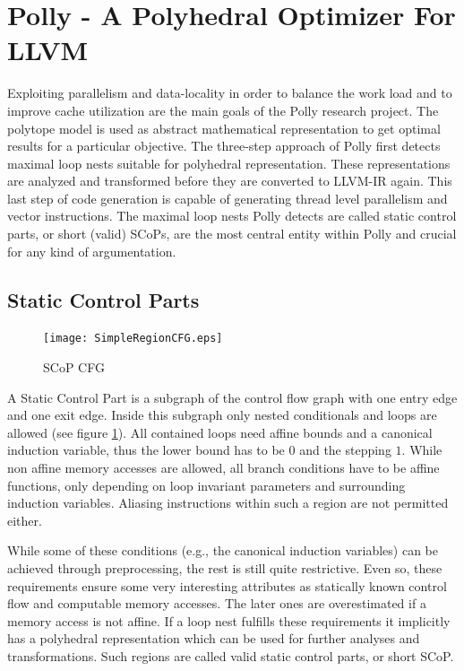\clearpage

\section{Polly - A Polyhedral Optimizer For LLVM}
\label{Polly}
Exploiting parallelism and data-locality in order to balance the work load
and to improve cache utilization are the main goals of the Polly research project.
The polytope model is used as abstract mathematical representation to get optimal
results for a particular objective. The three-step approach of Polly first detects
maximal loop nests suitable for polyhedral representation. These representations
are analyzed and transformed before they are converted to LLVM-IR again. This 
last step of code generation is capable of generating thread level parallelism 
and vector instructions. The maximal loop nests Polly detects
are called static control parts, or short (valid) SCoPs, are the most central 
entity within Polly and crucial for any kind of argumentation.



\subsection{Static Control Parts}
\begin{figure}
  \centering
  \texttt{[image: SimpleRegionCFG.eps]}
  \caption{SCoP CFG}
  \label{fig:PossibleSCoPCFG}  
\end{figure}
A Static Control Part is a subgraph of the control flow graph with one entry
edge and one exit edge. Inside this subgraph only nested conditionals and loops
are allowed (see figure \ref{fig:PossibleSCoPCFG}).
All contained loops need affine bounds and a canonical 
induction variable, thus the lower bound has to be $0$ and the stepping $1$. 
While non affine memory accesses are allowed, all branch conditions have to be
affine functions, only depending on loop invariant parameters and surrounding
induction variables. Aliasing instructions within such a region are not permitted
either. 

While some of these conditions (e.g., the canonical induction variables) 
can be achieved through preprocessing, the rest is still quite restrictive.
Even so, these requirements ensure some very interesting attributes as statically
known control flow and computable memory accesses. The later ones are 
overestimated if a memory access is not affine. If a loop nest fulfills 
these requirements it implicitly has a polyhedral representation which 
can be used for further analyses and transformations. Such regions
are called valid static control parts, or short SCoP. 

